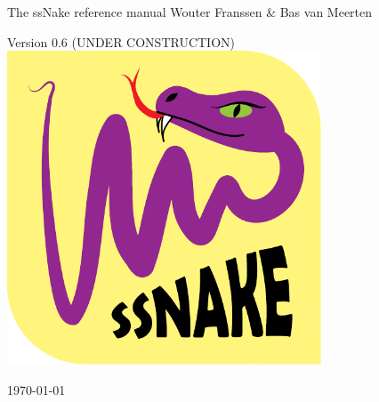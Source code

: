 %
%
%
%

\begin{titlepage}
\begin{center}




{\Huge The ssNake reference manual}
\vfill
\large Wouter Franssen \& Bas van Meerten

\vspace{1cm}
\large Version 0.6 (UNDER CONSTRUCTION)
\vfill
\includegraphics[width=0.7\textwidth]{Images/logo.pdf}\

\vfill
\vfill
{\large \today}

\end{center}

\end{titlepage}

